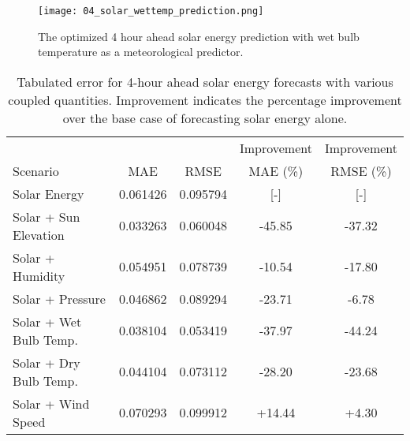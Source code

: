 \begin{figure*}[!ht]
  \centering
  \texttt{[image: 04\_solar\_wettemp\_prediction.png]}
  \caption{The optimized 4 hour ahead solar energy prediction with wet bulb
  temperature as a meteorological predictor.}
  \label{fig:wind04}
\end{figure*}
  \begin{table*}[!ht]
    \centering
    \caption{Tabulated error for 4-hour ahead solar energy forecasts with various coupled quantities. Improvement indicates the percentage improvement over the base case of forecasting solar energy alone.}
    \label{tab:solar04}
    \begin{tabular}{l|c|c|c|c}
      &  & & Improvement & Improvement \\
      Scenario  & MAE & RMSE & MAE (\%) & RMSE (\%)\\
      \hline
      Solar Energy & 0.061426 & 0.095794 & [-] & [-] \\
      Solar + Sun Elevation & 0.033263 & 0.060048 & -45.85 & -37.32\\
      Solar + Humidity & 0.054951 & 0.078739 & -10.54& -17.80\\
      Solar + Pressure & 0.046862 & 0.089294 & -23.71& -6.78\\
      Solar + Wet Bulb Temp. & 0.038104 & 0.053419 & -37.97& -44.24\\
      Solar + Dry Bulb Temp. & 0.044104 & 0.073112 & -28.20& -23.68\\
      Solar + Wind Speed & 0.070293 & 0.099912 & +14.44& +4.30\\
    \end{tabular}
  \end{table*}
